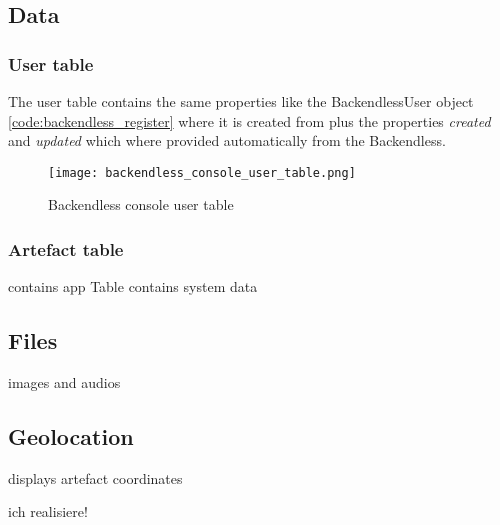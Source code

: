 \subsection{Data}
\subsubsection{User table}
The user table contains the same properties like the BackendlessUser object \ref{code:backendless_register} where it is created from plus the properties \textit{created} and \textit{updated} which where provided automatically from the Backendless.

\begin{figure}[H]
	\centering \texttt{[image: backendless\_console\_user\_table.png]}
	\caption[backendlessConsoleUserTable]{Backendless console user table}
	\label{fig:backendlessConsoleUserTable}
\end{figure}

\subsubsection{Artefact table}
contains app Table
contains system data
\subsection{Files}
images and audios
\subsection{Geolocation}
displays artefact coordinates

ich realisiere!